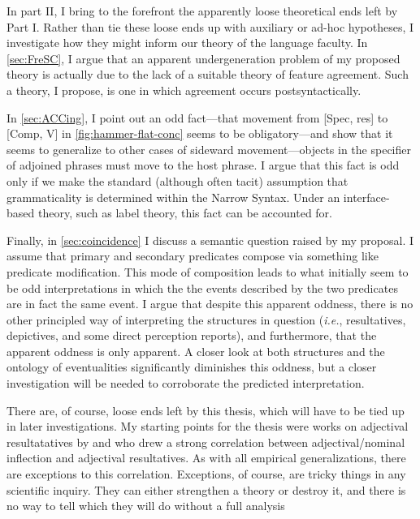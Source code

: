 \documentclass[MilwayThesis]{subfiles}
\begin{document}
In part II, I bring to the forefront the apparently loose theoretical ends left by Part I.
Rather than tie these loose ends up with auxiliary or ad-hoc hypotheses, I investigate how they might inform our theory of the language faculty.
In \cref{sec:FreSC}, I argue that an apparent undergeneration problem of my proposed theory is actually due to the lack of a suitable theory of feature agreement.
Such a theory, I propose, is one in which agreement occurs postsyntactically.

In \cref{sec:ACCing}, I point out an odd fact---that movement from [Spec, res] to [Comp, V] in \cref{fig:hammer-flat-conc} seems to be obligatory---and show that it seems to generalize to other cases of sideward movement---objects in the specifier of adjoined phrases must move to the host phrase.
I argue that this fact is odd only if we make the standard (although often tacit) assumption that grammaticality is determined within the Narrow Syntax.
Under an interface-based theory, such as label theory, this fact can be accounted for.

Finally, in \cref{sec:coincidence} I discuss a semantic question raised by my proposal.
I assume that primary and secondary predicates compose via something like predicate modification. 
This mode of composition leads to what initially seem to be odd interpretations in which the the events described by the two predicates are in fact the same event.
I argue that despite this apparent oddness, there is no other principled way of interpreting the structures in question (\textit{i.e.}, resultatives, depictives, and some direct perception reports), and furthermore, that the apparent oddness is only apparent.
A closer look at both structures and the ontology of eventualities significantly diminishes this oddness, but a closer investigation will be needed to corroborate the predicted interpretation.

There are, of course, loose ends left by this thesis, which will have to be tied up in later investigations.
My starting points for the thesis were works on adjectival resultatatives by \textcite{snyder1995language,snyder2001nature,snyder2016compound} and \textcite{kratzer2004building} who drew a strong correlation between adjectival/nominal inflection and adjectival resultatives.
As with all empirical generalizations, there are exceptions to this correlation.
Exceptions, of course, are tricky things in any scientific inquiry.
They can either strengthen a theory or destroy it, and there is no way to tell which they will do without a full analysis
\end{document}
